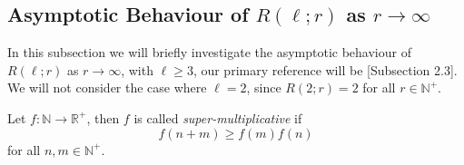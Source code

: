 \subsection{Asymptotic Behaviour of $R(\ell; r)$ as $r \to \infty$}\label{sec:ramsey_ass}
In this subsection we will briefly investigate the asymptotic behaviour of $R(\ell; r)$ as $r \to \infty$, with $\ell \geq 3$, our primary reference will be \cite{emogrt}[Subsection 2.3]. We will not consider the case where $\ell = 2$, since $R(2; r) = 2$ for all $r \in \mathbb{N}^{+}$.

\begin{definition}
	Let $f: \mathbb{N} \to \mathbb{R}^{+}$, then $f$ is called \textit{super-multiplicative} if
	\begin{equation*}
		f(n + m) \geq f(m)f(n)
	\end{equation*}
	for all $n,m \in \mathbb{N}^{+}$.
\end{definition}


